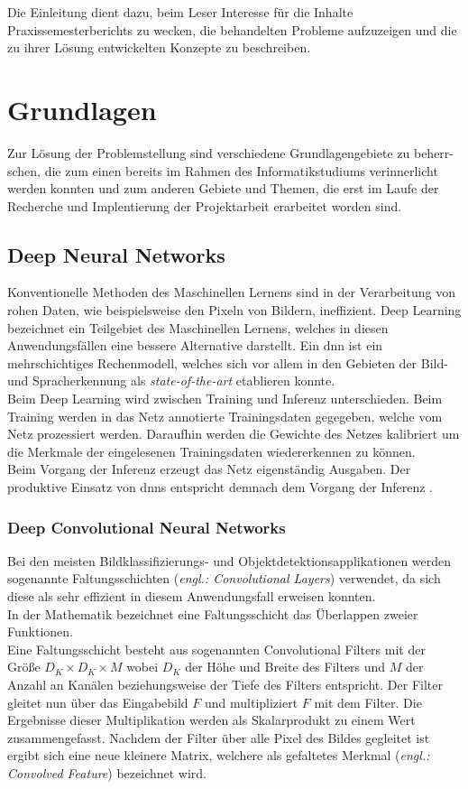 \documentclass[oneside]{ausarbeitung}
\begin{document}
Die Einleitung dient dazu, beim Leser Interesse für die Inhalte 
Praxissemesterberichts zu wecken, die behandelten Probleme aufzuzeigen 
und die zu ihrer Lösung entwickelten Konzepte zu beschreiben.
\chapter{Grundlagen}
\label{cha:grundlagen}
Zur Lösung der Problemstellung sind verschiedene Grundlagengebiete zu beherr-
schen, die zum einen bereits im Rahmen des Informatikstudiums verinnerlicht werden konnten und zum anderen Gebiete und Themen, die erst im Laufe der Recherche und Implentierung der Projektarbeit erarbeitet worden sind.
\section{Deep Neural Networks}
Konventionelle Methoden des Maschinellen Lernens sind in der Verarbeitung von rohen Daten, wie beispielsweise den Pixeln von Bildern, ineffizient.
Deep Learning bezeichnet ein Teilgebiet des Maschinellen Lernens, welches in diesen Anwendungsfällen eine bessere Alternative darstellt. Ein \ac{dnn} ist ein mehrschichtiges Rechenmodell, welches sich vor allem in den Gebieten der Bild- und Spracherkennung als \textit{state-of-the-art} etablieren konnte.\\
Beim Deep Learning wird zwischen Training und Inferenz unterschieden. Beim Training werden in das Netz annotierte Trainingsdaten gegegeben, welche vom Netz prozessiert werden. Daraufhin werden die Gewichte des Netzes kalibriert um die Merkmale der eingelesenen Trainingsdaten wiedererkennen zu können.\\
Beim Vorgang der Inferenz erzeugt das Netz eigenständig Ausgaben. Der produktive Einsatz von \acp{dnn} entspricht demnach dem Vorgang der Inferenz \cite{deepl-vs-traditional, deepl-lecun}. 
\subsection{Deep Convolutional Neural Networks}
Bei den meisten Bildklassifizierungs- und Objektdetektionsapplikationen werden sogenannte Faltungsschichten (\textit{engl.: Convolutional Layers}) verwendet, da sich diese als sehr effizient in diesem Anwendungsfall erweisen konnten.\\
In der Mathematik bezeichnet eine Faltungsschicht das Überlappen zweier Funktionen.\\
Eine Faltungsschicht besteht aus sogenannten Convolutional Filters mit der Größe $D_K \times D_K \times M$ wobei $D_K$ der Höhe und Breite des Filters und $M$ der Anzahl an Kanälen beziehungsweise der Tiefe des Filters entspricht. Der Filter gleitet nun über das Eingabebild $F$ und multipliziert $F$ mit dem Filter. Die Ergebnisse dieser Multiplikation werden als Skalarprodukt zu einem Wert zusammengefasst. Nachdem der Filter über alle Pixel des Bildes gegleitet ist ergibt sich eine neue kleinere Matrix, welchere als gefaltetes Merkmal (\textit{engl.: Convolved Feature}) bezeichnet wird.
\end{document}
